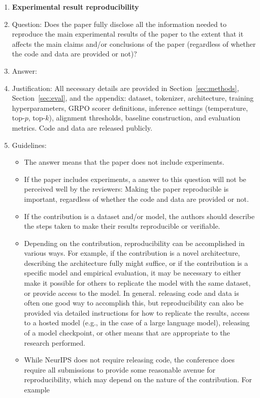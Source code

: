 \begin{enumerate}
    \item {\bf Experimental result reproducibility}
    \item[] Question: Does the paper fully disclose all the information needed to reproduce the main experimental results of the paper to the extent that it affects the main claims and/or conclusions of the paper (regardless of whether the code and data are provided or not)?
    \item[] Answer: \answerYes{}
    \item[] Justification: All necessary details are provided in Section~\ref{sec:methods}, Section~\ref{sec:eval}, and the appendix: dataset, tokenizer, architecture, training hyperparameters, GRPO scorer definitions, inference settings (temperature, top-$p$, top-$k$), alignment thresholds, baseline construction, and evaluation metrics. Code and data are released publicly.
    \item[] Guidelines:
    \begin{itemize}
        \item The answer \answerNA{} means that the paper does not include experiments.
        \item If the paper includes experiments, a \answerNo{} answer to this question will not be perceived well by the reviewers: Making the paper reproducible is important, regardless of whether the code and data are provided or not.
        \item If the contribution is a dataset and\slash or model, the authors should describe the steps taken to make their results reproducible or verifiable. 
        \item Depending on the contribution, reproducibility can be accomplished in various ways. For example, if the contribution is a novel architecture, describing the architecture fully might suffice, or if the contribution is a specific model and empirical evaluation, it may be necessary to either make it possible for others to replicate the model with the same dataset, or provide access to the model. In general. releasing code and data is often one good way to accomplish this, but reproducibility can also be provided via detailed instructions for how to replicate the results, access to a hosted model (e.g., in the case of a large language model), releasing of a model checkpoint, or other means that are appropriate to the research performed.
        \item While NeurIPS does not require releasing code, the conference does require all submissions to provide some reasonable avenue for reproducibility, which may depend on the nature of the contribution. For example

\end{itemize}
\end{enumerate}
